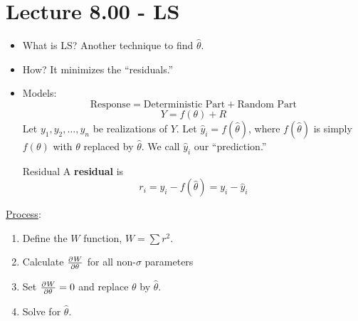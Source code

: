 \section{Lecture 8.00 - LS}
\begin{itemize}
    \item What is LS\@? Another technique to find $ \hat{\theta} $.
    \item How? It minimizes the ``residuals.''
    \item Models:
          \[ \text{Response}=\text{Deterministic Part}+\text{Random Part} \]
          \[ Y=f(\theta)+R \]
          Let $ y_1,y_2,\ldots,y_n $ be realizations of $ Y $. Let
          $ \hat{y}_i=f(\hat{\theta}) $, where $ f(\hat{\theta}) $
          is simply $ f(\theta) $ with $ \theta $ replaced
          by $ \hat{\theta} $. We call $ \hat{y}_i $ our ``prediction.''
          \begin{Definition}{Residual}{}
              A \textbf{residual} is
              \[ r_i=y_i-f(\hat{\theta})=y_i-\hat{y}_i \]
          \end{Definition}
\end{itemize}
\underline{Process}:
\begin{enumerate}[(1)]
    \item Define the $ W $ function, $ W=\sum r^2 $.
    \item Calculate $ \pd{W}{\theta} $ for all non-$ \sigma $
          parameters
    \item Set $ \pd{W}{\theta}=0 $ and replace $ \theta $ by $ \hat{\theta} $.
    \item Solve for $ \hat{\theta} $.
\end{enumerate}


